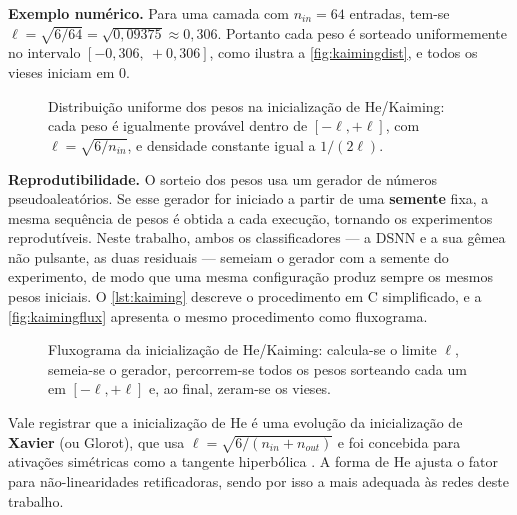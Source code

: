 				\par \textbf{Exemplo numérico.} Para uma camada com $n_{in}=64$ entradas, tem-se $\ell = \sqrt{6/64} = \sqrt{0{,}09375} \approx 0{,}306$. Portanto cada peso é sorteado uniformemente no intervalo $[-0{,}306,\ +0{,}306]$, como ilustra a \autoref{fig:kaimingdist}, e todos os vieses iniciam em $0$.

				\begin{figure}[h]
					\centering
					\caption[Distribuição dos pesos na inicialização de He/Kaiming]{Distribuição uniforme dos pesos na inicialização de He/Kaiming: cada peso é igualmente provável dentro de $[-\ell,+\ell]$, com $\ell=\sqrt{6/n_{in}}$, e densidade constante igual a $1/(2\ell)$.}
					\resizebox{0.6\linewidth}{!}{}
					\label{fig:kaimingdist}
				\end{figure}

				\par \textbf{Reprodutibilidade.} O sorteio dos pesos usa um gerador de números pseudoaleatórios. Se esse gerador for iniciado a partir de uma \textbf{semente} fixa, a mesma sequência de pesos é obtida a cada execução, tornando os experimentos reprodutíveis. Neste trabalho, ambos os classificadores --- a \ac{DSNN} e a sua gêmea não pulsante, as duas residuais --- semeiam o gerador com a semente do experimento, de modo que uma mesma configuração produz sempre os mesmos pesos iniciais. O \autoref{lst:kaiming} descreve o procedimento em C simplificado, e a \autoref{fig:kaimingflux} apresenta o mesmo procedimento como fluxograma.

				

				\begin{figure}[h]
					\centering
					\caption[Fluxograma da inicialização de He/Kaiming]{Fluxograma da inicialização de He/Kaiming: calcula-se o limite $\ell$, semeia-se o gerador, percorrem-se todos os pesos sorteando cada um em $[-\ell,+\ell]$ e, ao final, zeram-se os vieses.}
					\resizebox{0.55\linewidth}{!}{}
					\label{fig:kaimingflux}
				\end{figure}

				\par Vale registrar que a inicialização de He é uma evolução da inicialização de \textbf{Xavier} (ou Glorot), que usa $\ell = \sqrt{6/(n_{in}+n_{out})}$ e foi concebida para ativações simétricas como a tangente hiperbólica \cite{glorot2010understanding}. A forma de He ajusta o fator para não-linearidades retificadoras, sendo por isso a mais adequada às redes deste trabalho.

